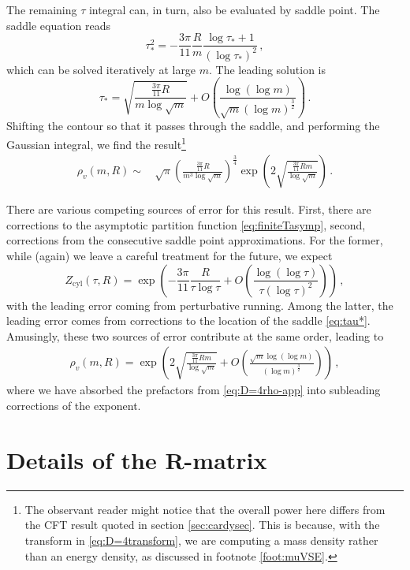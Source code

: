 \documentclass[
 reprint,
 amsmath,
 pre,
 amssymb,
 nofootinbib,
 aps,
 longbibliography,
]{revtex4-1}
\newcommand{\<}{{\langle}}
\renewcommand{\>}{{\rangle}}
\begin{document}
The remaining $\tau$ integral can, in turn, also be evaluated by saddle point. The saddle equation reads
\begin{equation}
	\tau_*^2=-\frac{3\pi}{11}\frac{R}{ m}\frac{\log \tau_* + 1}{(\log\tau_*)^2}\,,
\end{equation}
which can be solved iteratively at large $ m$.
The leading solution is
\begin{equation}\label{eq:tau*}
	\tau_* = \sqrt{\frac{\frac{3\pi}{11}R}{ m \log \sqrt  m}} + O\left(\frac{\log(\log m)}{\sqrt{ m} (\log  m)^\frac{3}{2}}\right)\,.
\end{equation}
Shifting the contour so that it passes through the saddle,
and performing the Gaussian integral, we find the result\footnote{The observant reader might notice that the overall power here differs from the CFT result \cite{Diatlyk:2024qpr,Kravchuk:2024qoh} quoted in section \ref{sec:cardysec}. This is because, with the transform in \eqref{eq:D=4transform}, we are computing a mass density rather than an energy density, as discussed in footnote \ref{foot:muVSE}.}
\begin{align}\label{eq:D=4rho-app}
	\rho_v( m,R) \sim&\, \sqrt{\pi}\left(\frac{\frac{3\pi}{11}R}{ m^3\log \sqrt m}\right)^\frac{3}{4} \exp\left(2\sqrt{\frac{\frac{3\pi}{11}R m}{\log \sqrt  m}}\right)\,.
\end{align}

There are various competing sources of error for this result. First, there are corrections to the asymptotic partition function \eqref{eq:finiteTasymp}, second, corrections from the consecutive saddle point approximations. For the former, while (again) we leave a careful treatment for the future, we expect
$$Z_{\text{cyl}}(\tau,R) = \exp\left(-\frac{3\pi}{11}\frac{R}{\tau \log \tau} + O\left(\frac{\log (\log\tau)}{\tau (\log\tau)^2}\right)\right)\,,$$
with the leading error coming from perturbative running.
Among the latter, the leading error comes from corrections to the location of the saddle \eqref{eq:tau*}. Amusingly, these two sources of error contribute at the same order, leading to
\begin{align}
	\rho_v( m,R) = \exp\left(2\sqrt{\frac{\frac{3\pi}{11}R m}{\log \sqrt  m}} + O\left(\frac{\sqrt{ m} \log(\log m)}{(\log  m)^\frac{3}{2}}\right)\right)\,,
\end{align}
where we have absorbed the prefactors from \eqref{eq:D=4rho-app} into subleading corrections of the exponent.

\section{Details of the R-matrix}\label{app:R-matrix}
\end{document}
